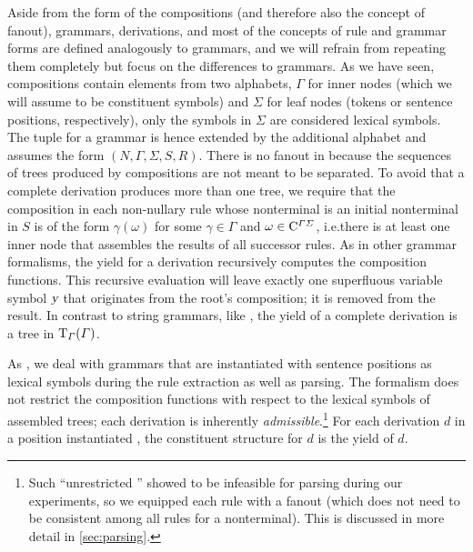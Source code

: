 \documentclass[../../document.tex]{subfiles}
\begin{document}
    Aside from the form of the compositions (and therefore also the concept of fanout),  grammars, derivations, and most of the concepts of rule and grammar forms are defined analogously to  grammars, and we will refrain from repeating them completely but focus on the differences to  grammars.
    As we have seen,  compositions contain elements from two alphabets, \(\varGamma\) for inner nodes (which we will assume to be constituent symbols) and  \(\varSigma\) for leaf nodes (tokens or sentence positions, respectively), only the symbols in \(\varSigma\) are considered lexical symbols.
    The tuple for a  grammar is hence extended by the additional alphabet and assumes the form \((N, \varGamma, \varSigma, S, R)\).
    There is no fanout in  because the sequences of trees produced by compositions are not meant to be separated.
    To avoid that a complete derivation produces more than one tree, we require that the composition in each non-nullary rule whose  nonterminal is an initial nonterminal in \(S\) is of the form \(\gamma ( \omega )\) for some \(\gamma \in \varGamma\) and \(\omega \in \mathrm{C}^{\varGamma \varSigma}\), i.e.\@ there is at least one inner node that assembles the results of all successor rules.
    As in other grammar formalisms, the yield for a derivation recursively computes the composition functions.
    This recursive evaluation will leave exactly one superfluous variable symbol \(\textsl{y}\) that originates from the root's composition; it is removed from the result.
    In contrast to string grammars, like , the yield of a complete derivation is a tree in \(\operatorname{T}_\varGamma(\varGamma)\).

    As , we deal with  grammars that are instantiated with sentence positions as lexical symbols during the rule extraction as well as parsing.
    The formalism does not restrict the composition functions with respect to the lexical symbols of assembled trees; each derivation is inherently \emph{admissible}.\footnote{
        Such ``unrestricted '' showed to be infeasible for parsing during our experiments, so we equipped each rule with a fanout (which does not need to be consistent among all rules for a  nonterminal).
        This is discussed in more detail in \cref{sec:parsing}.
    }
    For each derivation \(d\) in a position instantiated , the constituent structure for \(d\) is the yield of \(d\).
\end{document}

